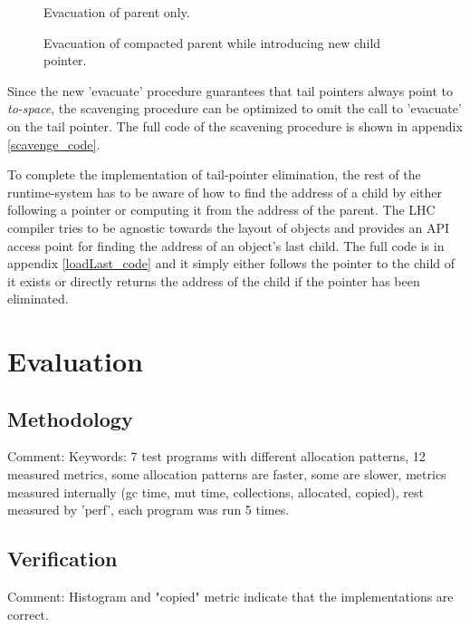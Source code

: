 \documentclass[a4paper,oneside]{memoir}
\newcommand{\makecomment}[1]{{\color{red} Comment: #1}}
\begin{document}
\begin{figure}[b]
  
  \caption{Evacuation of parent only.}
  \label{multiple_parents}
\end{figure}


\begin{figure}
  
  \caption{Evacuation of compacted parent while introducing new child pointer.}
  \label{parent_no_child}
\end{figure}

Since the new 'evacuate' procedure guarantees that tail pointers always point
to \emph{to-space}, the scavenging procedure can be optimized to omit the
call to 'evacuate' on the tail pointer. The full code of the scavening procedure
is shown in appendix \ref{scavenge_code}.

To complete the implementation of tail-pointer elimination, the rest of the
runtime-system has to be aware of how to find the address of a child by either
following a pointer or computing it from the address of the parent. The LHC
compiler tries to be agnostic towards the layout of objects and provides
an API access point for finding the address of an object's last child. The full
code is in appendix \ref{loadLast_code} and it simply either follows the pointer
to the child of it exists or directly returns the address of the child if the
pointer has been eliminated.



\chapter{Evaluation}

\section{Methodology}
\makecomment{Keywords: 7 test programs with different allocation patterns, 12 measured metrics,
some allocation patterns are faster, some are slower, metrics measured internally
(gc time, mut time, collections, allocated, copied), rest measured
by 'perf', each program was run 5 times.}

\section{Verification}

\makecomment{Histogram and "copied" metric indicate that the implementations
are correct.}
\end{document}
